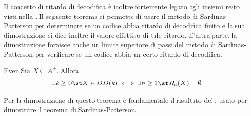 Il concetto di ritardo di decodifica è inoltre fortemente legato agli insiemi resto visti nella .
Il seguente teorema ci permette di usare il metodo di Sardinas-Patterson per determinare se un codice abbia ritardo di decodifica finito e la sua dimostrazione ci dice inoltre il valore effettivo di tale ritardo. D'altra parte, la dimostrazione fornisce anche un limite superiore di passi del metodo di Sardinas-Patterson per verificare se un codice abbia un certo ritardo di decodifica.

\begin{theorem}{Even}
  Sia \(X \subseteq A^+\). Allora 
  \[\exists k \geq 0 \st X \in DD(k) \iff \exists n \geq 1 \st R_n(X) = \emptyset\]
\end{theorem}

Per la dimostrazione di questo teorema è fondamentale il risultato del , usato per dimostrare il teorema di Sardinas-Patterson.

